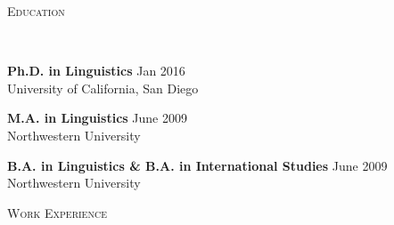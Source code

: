\documentclass[9pt]{article}
\newenvironment{changemargin}[2]{%
  \begin{list}{}{%
    \setlength{\topsep}{0pt}%
    \setlength{\leftmargin}{#1}%
    \setlength{\rightmargin}{#2}%
    \setlength{\listparindent}{\parindent}%
    \setlength{\itemindent}{\parindent}%
    \setlength{\parsep}{\parskip}%
  }%
  \item[]}{\end{list}
}
\newcommand{\lineover}{
	\begin{changemargin}{-0.05in}{-0.05in}
		\vspace*{-8pt}
		\hrulefill \\
		\vspace*{-2pt}
	\end{changemargin}
}
\newcommand{\header}[1]{
	\begin{changemargin}{-0.5in}{-0.5in}
		\scshape{#1}\\
  	\lineover
	\end{changemargin}
}
\newenvironment{body} {
	\vspace*{-16pt}
	\begin{changemargin}{-0.25in}{-0.5in}
  }	
	{\end{changemargin}
}
\begin{document}
\smallskip


\header{\color{red}Education}

\begin{body}
	\vspace{14pt}
	
	\textbf{Ph.D. in Linguistics} \hfill Jan 2016\\
	University of California, San Diego\\
 	\medskip
	\medskip

	\textbf{M.A. in Linguistics} \hfill June 2009\\
	Northwestern University
 	\medskip
	\medskip

	\textbf{B.A. in Linguistics \& B.A. in International Studies} \hfill June 2009\\
	Northwestern University\\
	\medskip
	\medskip

\end{body}

\smallskip


\header{\color{red}Work Experience}
\end{document}
